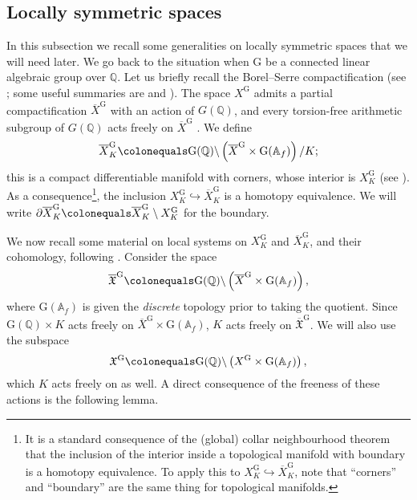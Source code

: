 \documentclass{amsart}
\theoremstyle{remark}
\numberwithin{equation}{subsection}
\newcommand{\A}{\AA}
\newcommand{\Q}{\QQ}
\renewcommand{\AA}{{\mathbb A}}
\newcommand{\QQ}{{\mathbb Q}}
\newcommand{\ol}{\overline}
\newcommand{\mf}{\mathfrak}
\newcommand{\defeq}{\colonequals}
\renewcommand{\(}{\left(}
\renewcommand{\)}{\right)}
\begin{document}
\subsection{Locally symmetric spaces}\label{subsec: loc sym space} In this subsection we recall some generalities on locally symmetric spaces that we will need later. We go back to the situation when $\mathrm{G}$ be a connected linear algebraic group over $\Q$. Let us briefly recall the Borel--Serre compactification (see \cite{borel-serre}; some useful summaries are \cite[\S 3.1]{newton-thorne} and \cite[\S 2.1]{accghlnstt}). The space $X^\mathrm{G}$ admits a partial compactification $\ol{X}^\mathrm{G}$ \cite[\S 7.1]{borel-serre} with an action of $G(\Q)$, and every torsion-free arithmetic subgroup of $G(\Q)$ acts freely on $\ol{X}^\mathrm{G}$ \cite[\S 9.5]{borel-serre}. We define
\[
\ol{X}^\mathrm{G}_{K}\defeq \mathrm{G}(\Q)\backslash \left(\ol{X}^\mathrm{G}\times \mathrm{G}(\A_f)\right)/K;
\]
this is a compact differentiable manifold with corners, whose interior is $X^\mathrm{G}_{K}$ (see \cite[\S 7.1, Theorem 9.3, \S 9.5]{borel-serre}). As a consequence\footnote{It is a standard consequence of the (global) collar neighbourhood theorem \cite[Theorem 2]{brown} that the inclusion of the interior inside a topological manifold with boundary is a homotopy equivalence. To apply this to $X^\mathrm{G}_{K} \hookrightarrow \ol{X}^\mathrm{G}_{K}$, note that ``corners'' and ``boundary'' are the same thing for topological manifolds.}, the inclusion $X^\mathrm{G}_{K} \hookrightarrow \ol{X}^\mathrm{G}_{K}$ is a homotopy equivalence. We will write $\partial \ol{X}^\mathrm{G}_{K} \defeq \ol{X}^\mathrm{G}_{K} \setminus X^\mathrm{G}_{K}$ for the boundary.

\medskip

We now recall some material on local systems on $X_K^\mathrm{G}$ and $\ol{X}_K^\mathrm{G}$, and their cohomology, following \cite{newton-thorne}. Consider the space
\[ 
\ol{\mf{X}}^\mathrm{G} \defeq \mathrm{G}(\Q)\backslash \left(\ol{X}^\mathrm{G}\times \mathrm{G}(\A_f)\right),
\]
where $\mathrm{G}(\A_f)$ is given the \emph{discrete} topology prior to taking the quotient. Since $\mathrm{G}(\Q) \times K$ acts freely on $\ol{X}^\mathrm{G}\times \mathrm{G}(\A_f)$,
$K$ acts freely on $\ol{\mf{X}}^\mathrm{G}$. We will also use the subspace
\[ 
\mf{X}^\mathrm{G} \defeq \mathrm{G}(\Q)\backslash \left( X^\mathrm{G}\times \mathrm{G}(\A_f)\right),
\]
which $K$ acts freely on as well. A direct consequence of the freeness of these actions is the following lemma.
\end{document}
